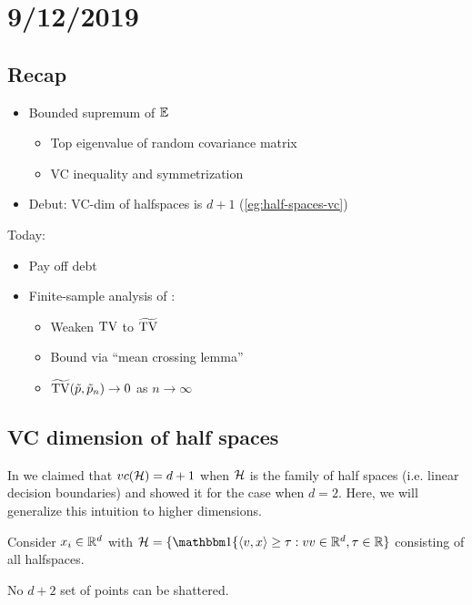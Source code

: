 \section{9/12/2019}

\subsection{Recap}

\begin{itemize}
    \item Bounded supremum of $\mathbb{E}$
        \begin{itemize}
            \item Top eigenvalue of random covariance matrix
            \item VC inequality and symmetrization
        \end{itemize}
    \item Debut: VC-dim of halfspaces is $d+1$ (\cref{eg:half-spaces-vc})
\end{itemize}

Today:
\begin{itemize}
    \item Pay off debt
    \item Finite-sample analysis of :
    \begin{itemize}
        \item Weaken $\operatorname{TV}$ to $\widetilde{\operatorname{TV}}$
        \item Bound  via ``mean crossing lemma''
        \item $\widetilde{\operatorname{TV}}(\tilde{p}, \tilde{p}_n) \to 0$ as $n \to \infty$
    \end{itemize}
\end{itemize}

\subsection{VC dimension of half spaces}

In  we claimed that $vc(\mathcal{H}) = d+1$ when $\mathcal{H}$ is
the family of half spaces (i.e. linear decision boundaries) and showed it
for the case when $d=2$. Here, we will generalize this intuition to
higher dimensions.

Consider $x_i \in \mathbb{R}^d$ with $\cH = \{ \ind\{\braket{v, x} \geq \tau : v v\in \RR^d, \tau \in \RR\}$ consisting of all halfspaces.

\begin{proposition}
    No $d+2$ set of points can be shattered.
\end{proposition}

